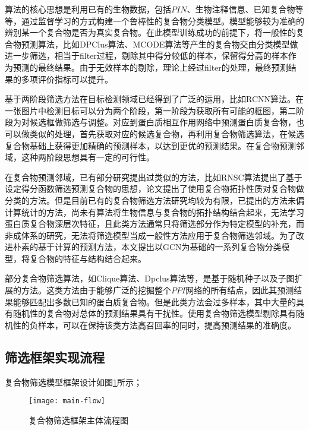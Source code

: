 算法的核心思想是利用已有的生物数据，包括$PIN$、生物注释信息、已知复合物等等，通过监督学习的方式构建一个鲁棒性的复合物分类模型。模型能够较为准确的辨别某一个复合物是否为真实复合物。在此模型训练成功的前提下，将一般性的复合物预测算法，比如DPClus算法\cite{altaf-ul-amin_development_2006}、MCODE算法\cite{bader_automated_2003}等产生的复合物交由分类模型做进一步筛选，相当于filter过程，剔除其中得分较低的样本，保留得分高的样本作为预测的最终结果。由于无效样本的剔除，理论上经过filter的处理，最终预测结果的多项评价指标可以提升。

基于两阶段筛选方法在目标检测领域已经得到了广泛的运用，比如RCNN算法\cite{girshick_rich_2014}。在一张图片中检测目标可以分为两个阶段，第一阶段为获取所有可能的框图，第二阶段为对候选框做筛选与调整。对应到蛋白质相互作用网络中预测蛋白质复合物，也可以做类似的处理，首先获取对应的候选复合物，再利用复合物筛选算法，在候选复合物基础上获得更加精确的预测样本，以达到更优的预测结果。在复合物预测邻域，这种两阶段思想具有一定的可行性。

在复合物预测邻域，已有部分研究提出过类似的方法，比如RNSC算法\cite{king_protein_2004}提出了基于设定得分函数筛选预测复合物的思想，论文\cite{yu_predicting_2014}提出了使用复合物拓扑性质对复合物做分类的方法。但是目前已有的复合物筛选方法研究均较为有限，已提出的方法未偏计算统计的方法，尚未有算法将生物信息与复合物的拓扑结构结合起来，无法学习蛋白质复合物深层次特征，且此类方法通常只将筛选部分作为特定模型的补充，而非成体系的研究，无法将筛选模型当成一般性方法应用于复合物筛选邻域。为了改进朴素的基于计算的预测方法，本文提出以GCN为基础的一系列复合物分类模型，将复合物的特征与结构结合起来。

部分复合物筛选算法，如Clique算法\cite{spirin_protein_2003}、Dpclus算法等，是基于随机种子以及子图扩展的方法。这类方法由于能够广泛的挖掘整个$PPI$网络的所有结点，因此其预测结果能够匹配出多数已知的蛋白质复合物。但是此类方法会过多样本，其中大量的具有随机性的复合物对总体的预测结果具有干扰性。使用复合物筛选模型剔除具有随机性的负样本，可以在保持该类方法高召回率的同时，提高预测结果的准确度。

\subsection{筛选框架实现流程}
\label{subsection:motivationAndThinking:flow}

复合物筛选模型框架设计如图\ref{fig:main-flow}所示；

\begin{figure}[htbp]
    \centering
    \texttt{[image: main-flow]}
    \caption{复合物筛选框架主体流程图}
    \label{fig:main-flow}
\end{figure}

